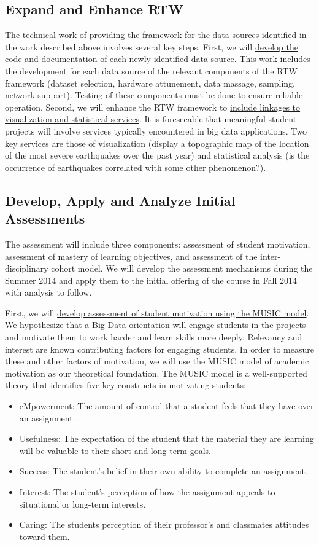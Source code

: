 \documentclass[11pt]{article}
\begin{document}
\subsection{Expand and Enhance RTW}

The technical work of providing the framework for the data sources identified in the work described above involves several key steps. First, we will \uline{develop the code and documentation of each newly identified data source}. This work includes the development for each data source of the relevant components of the RTW framework (dataset selection, hardware attunement, data massage, sampling, network support). Testing of these components must be done to ensure reliable operation. Second, we will enhance the RTW framework to \uline{include linkages to visualization and statistical services}. It is foreseeable that meaningful student projects will involve services typically encountered in big data applications. Two key services are those of visualization (display a topographic map of the location of the most severe earthquakes over the past year) and statistical analysis (is the occurrence of earthquakes correlated with some other phenomenon?).

\subsection{Develop, Apply and Analyze Initial Assessments}
The assessment will include three components: assessment of student motivation, assessment of mastery of learning objectives, and assessment of the inter-disciplinary cohort model. We will develop the assessment mechanisms during the Summer 2014 and apply them to the initial offering of the course in Fall 2014 with analysis to follow. 

First, we will \uline{develop assessment of student motivation using the MUSIC model}. We hypothesize that a Big Data orientation will engage students in the projects and motivate them to work harder and learn skills more deeply. Relevancy and interest are known contributing factors for engaging students\cite{jones-description}. In order to measure these and other factors of motivation, we will use the MUSIC model of academic motivation as our theoretical foundation.
The MUSIC model is a well-supported theory that identifies five key constructs in motivating students:
\begin{itemize}
	\item eMpowerment: The amount of control that a student feels that they have over an assignment.
	\item Usefulness: The expectation of the student that the material they are learning will be valuable to their short and long term goals.
	\item Success: The student's belief in their own ability to complete an assignment.
	\item Interest: The student's perception of how the assignment appeals to situational or long-term interests.
	\item Caring: The students perception of their professor's and classmates attitudes toward them.
\end{itemize}
\end{document}

